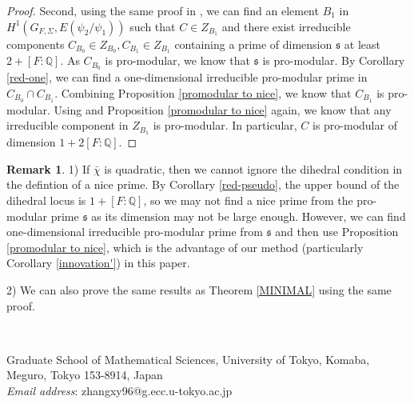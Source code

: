 \documentclass[12pt]{amsart}
\theoremstyle{plain}
\theoremstyle{definition}
\newtheorem{rem}[thm]{Remark}
\theoremstyle{remark}
\begin{document}
\begin{proof}
	Second, using the same proof in \cite[Step (2), page 1154 \& 1155]{pan2022fontaine}, we can find an element $B_1 $ in $H^1(G_{F,\Sigma},E(\psi_2/\psi_1)) $ such that $C \in Z_{B_1}$ and	there exist irreducible components $C_{B_0}\in Z_{B_0}, C_{B_1}\in Z_{B_1}$ containing a prime of dimension $\mathfrak{s}$ at least $2+[F: \mathbb{Q}]$. As $C_{B_0} $ is pro-modular, we know that $\mathfrak{s}$ is pro-modular. By Corollary \ref{red-one}, we can find a one-dimensional irreducible pro-modular prime in $C_{B_0} \cap C_{B_1} $. Combining Proposition \ref{promodular to nice}, we know that $C_{B_1} $ is pro-modular. Using \cite[Corollary 7.4.13]{pan2022fontaine} and Proposition \ref{promodular to nice} again, we know that any irreducible component in  $Z_{B_1}$ is pro-modular. In particular, $C$ is pro-modular of dimension $1+2[F:\mathbb{Q}]$.
\end{proof}

\begin{rem}\label{adv}
	1) If $\bar{\chi}$ is quadratic, then we cannot ignore the dihedral condition in the defintion of a nice prime. By Corollary \ref{red-pseudo}, the upper bound of the dihedral locus is $1+[F: \mathbb{Q}]$, so we may not find a nice prime from the pro-modular prime $\mathfrak{s}$ as its dimension may not be large enough. However, we can find one-dimensional irreducible pro-modular prime from $\mathfrak{s} $ and then use Proposition \ref{promodular to nice}, which is the advantage of our method (particularly Corollary \ref{innovation'}) in this paper.
	
	2) We can also prove the same results as Theorem \ref{MINIMAL} using the same proof.
\end{rem}

\newpage

~
~

Graduate School of Mathematical Sciences, University of Tokyo, Komaba, Meguro, Tokyo 153-8914, Japan\\

\textit{Email address}: zhangxy96@g.ecc.u-tokyo.ac.jp
\end{document}
